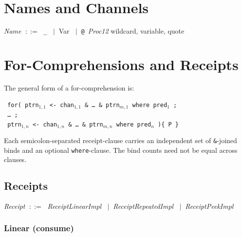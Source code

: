 \documentclass[11pt,a4paper]{article}
\newcommand{\kw}[1]{\texttt{\textcolor{kw}{#1}}}       %
\newcommand{\sym}[1]{\texttt{#1}}                       %
\newcommand{\nt}[1]{\textit{\textcolor{nt}{#1}}}        %
\newcommand{\tok}[1]{\textsf{#1}}                       %
\newcommand{\OR}{\ensuremath{\;\mid\;}}                  %
\newcommand{\bnfdef}{\ensuremath{\;::=\;}}               %
\newenvironment{grammar}{%
  \par\smallskip\begin{list}{}{%
    \setlength{\leftmargin}{1.5em}%
    \setlength{\itemsep}{2pt}%
    \setlength{\parsep}{0pt}}%
}{\end{list}\smallskip}
\begin{document}
\section{Names and Channels}
\label{sec:names}

\begin{grammar}
\item \nt{Name} \bnfdef
    \sym{\_}
    \OR \tok{Var}
    \OR \sym{@}~\nt{Proc12}
    \hfill\textcolor{cmt}{wildcard, variable, quote}
\end{grammar}


\section{For-Comprehensions and Receipts}
\label{sec:for}

The general form of a for-comprehension is:

\medskip
\noindent\hspace{1em}\texttt{%
\kw{for}(\,ptrn$_{1,1}$ <- chan$_{1,1}$ \& \ldots\ \& ptrn$_{m,1}$
\kw{where} pred$_1$\,;%
}\\
\hspace{3.5em}\texttt{%
\ldots\,;%
}\\
\hspace{3.5em}\texttt{%
ptrn$_{1,n}$ <- chan$_{1,n}$ \& \ldots\ \& ptrn$_{m,n}$
\kw{where} pred$_n$\,)\{\,P\,\}%
}
\medskip

Each semicolon-separated receipt-clause carries an independent set of
\sym{\&}-joined binds and an optional \kw{where}-clause.  The bind counts
need not be equal across clauses.

\subsection{Receipts}

\begin{grammar}
\item \nt{Receipt} \bnfdef
    \nt{ReceiptLinearImpl}
    \OR \nt{ReceiptRepeatedImpl}
    \OR \nt{ReceiptPeekImpl}
\end{grammar}

\subsubsection{Linear (consume)}
\end{document}
